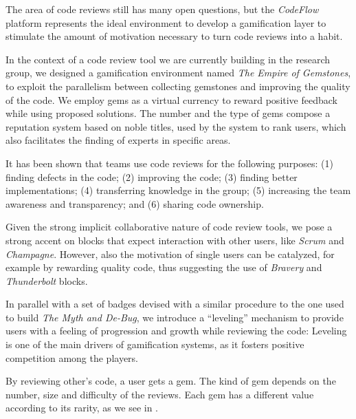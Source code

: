 The area of code reviews still has many open questions, but the \textit{CodeFlow} platform represents the ideal environment to develop a gamification layer to stimulate the amount of motivation necessary to turn code reviews into a habit.

In the context of a code review tool we are currently building in the research group, we designed a gamification environment named \textit{The Empire of Gemstones}, to exploit the parallelism between collecting gemstones and improving the quality of the code.
We employ gems as a virtual currency to reward positive feedback while using proposed solutions.
The number and the type of gems compose a reputation system based on noble titles, used by the system to rank users, which also facilitates the finding of experts in specific areas.

It has been shown \cite{Bacc2013a} that teams use code reviews for the following purposes: (1) finding defects in the code; (2) improving the code; (3) finding better implementations; (4) transferring knowledge in the group; (5) increasing the team awareness and transparency; and (6) sharing code ownership.

Given the strong implicit collaborative nature of code review tools, we pose a strong accent on blocks that expect interaction with other users, like \emph{Scrum} and \emph{Champagne}.
However, also the motivation of single users can be catalyzed, for example by rewarding quality code, thus suggesting the use of \emph{Bravery} and \emph{Thunderbolt} blocks.

In parallel with a set of badges devised with a similar procedure to the one used to build \textit{The Myth and De-Bug}, we introduce a ``leveling'' mechanism to provide users with a feeling of progression and growth while reviewing the code: Leveling is one of the main drivers of gamification systems, as it fosters positive competition among the players.

By reviewing other's code, a user gets a gem.
The kind of gem depends on the number, size and difficulty of the reviews.
Each gem has a different value according to its rarity, as we see in .

